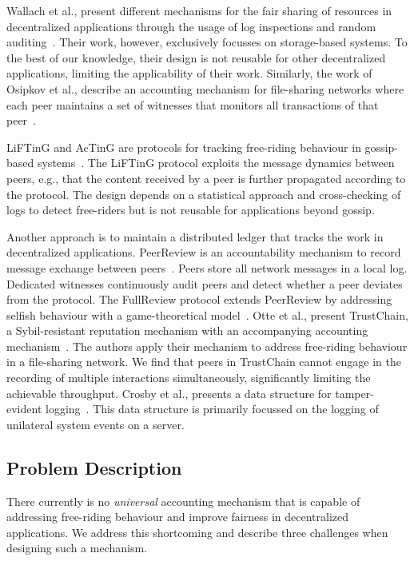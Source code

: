 Wallach et al., present different mechanisms for the fair sharing of resources in decentralized applications through the usage of log inspections and random auditing~\cite{wallach2003enforcing}.
Their work, however, exclusively focusses on storage-based systems.
To the best of our knowledge, their design is not reusable for other decentralized applications, limiting the applicability of their work.
Similarly, the work of Osipkov et al., describe an accounting mechanism for file-sharing networks where each peer maintains a set of witnesses that monitors all transactions of that peer~\cite{osipkov2006robust}.

LiFTinG and AcTinG are protocols for tracking free-riding behaviour in gossip-based systems~\cite{guerraoui2010lifting,mokhtar2014acting}.
The LiFTinG protocol exploits the message dynamics between peers, e.g., that the content received by a peer is further propagated according to the protocol.
The design depends on a statistical approach and cross-checking of logs to detect free-riders but is not reusable for applications beyond gossip.

Another approach is to maintain a distributed ledger that tracks the work in decentralized applications.
PeerReview is an accountability mechanism to record message exchange between peers~\cite{haeberlen2007peerreview}.
Peers store all network messages in a local log.
Dedicated witnesses continuously audit peers and detect whether a peer deviates from the protocol.
The FullReview protocol extends PeerReview by addressing selfish behaviour with a game-theoretical model~\cite{diarra2014fullreview}.
Otte et al., present TrustChain, a Sybil-resistant reputation mechanism with an accompanying accounting mechanism~\cite{otte2017trustchain}.
The authors apply their mechanism to address free-riding behaviour in a file-sharing network.
We find that peers in TrustChain cannot engage in the recording of multiple interactions simultaneously, significantly limiting the achievable throughput.
Crosby et al., presents a data structure for tamper-evident logging~\cite{crosby2009efficient}.
This data structure is primarily focussed on the logging of unilateral system events on a server.

\subsection{Problem Description}
\label{sec:problem_description}
There currently is no \emph{universal} accounting mechanism that is capable of addressing free-riding behaviour and improve fairness in decentralized applications.
We address this shortcoming and describe three challenges when designing such a mechanism.

